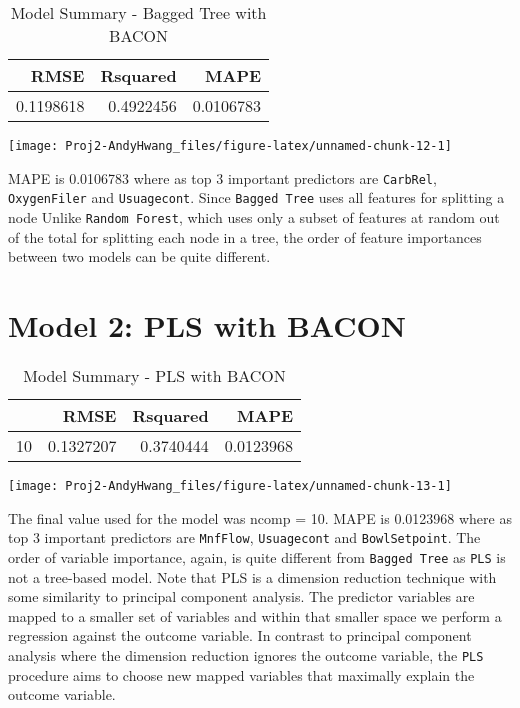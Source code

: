 \documentclass[]{report}
\begin{document}
\begin{table}[H]

\caption{\label{tab:unnamed-chunk-12}Model Summary - Bagged Tree with BACON}
\centering
\fontsize{8}{10}\selectfont
\begin{tabular}[t]{rrr}
\toprule
\textbf{RMSE} & \textbf{Rsquared} & \textbf{MAPE}\\
\midrule
\rowcolor{gray!6}  0.1198618 & 0.4922456 & 0.0106783\\
\bottomrule
\end{tabular}
\end{table}

\begin{center}\texttt{[image: Proj2-AndyHwang\_files/figure-latex/unnamed-chunk-12-1]} \end{center}

MAPE is 0.0106783 where as top 3 important predictors are
\texttt{CarbRel}, \texttt{OxygenFiler} and \texttt{Usuagecont}. Since
\texttt{Bagged\ Tree} uses all features for splitting a node Unlike
\texttt{Random\ Forest}, which uses only a subset of features at random
out of the total for splitting each node in a tree, the order of feature
importances between two models can be quite different.

\section{Model 2: PLS with BACON}\label{model-2-pls-with-bacon}

\begin{table}[H]

\caption{\label{tab:unnamed-chunk-13}Model Summary - PLS with BACON}
\centering
\fontsize{8}{10}\selectfont
\begin{tabular}[t]{lrrr}
\toprule
\textbf{ } & \textbf{RMSE} & \textbf{Rsquared} & \textbf{MAPE}\\
\midrule
\rowcolor{gray!6}  10 & 0.1327207 & 0.3740444 & 0.0123968\\
\bottomrule
\end{tabular}
\end{table}

\begin{center}\texttt{[image: Proj2-AndyHwang\_files/figure-latex/unnamed-chunk-13-1]} \end{center}

The final value used for the model was ncomp = 10. MAPE is 0.0123968
where as top 3 important predictors are \texttt{MnfFlow},
\texttt{Usuagecont} and \texttt{BowlSetpoint}. The order of variable
importance, again, is quite different from \texttt{Bagged\ Tree} as
\texttt{PLS} is not a tree-based model. Note that PLS is a dimension
reduction technique with some similarity to principal component
analysis. The predictor variables are mapped to a smaller set of
variables and within that smaller space we perform a regression against
the outcome variable. In contrast to principal component analysis where
the dimension reduction ignores the outcome variable, the \texttt{PLS}
procedure aims to choose new mapped variables that maximally explain the
outcome variable.
\end{document}
